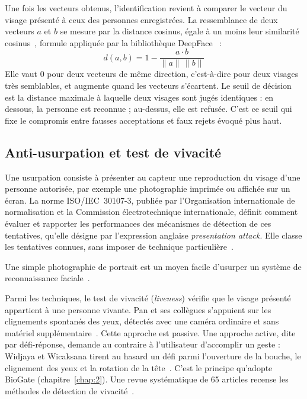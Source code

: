 \begin{maj}
Une fois les vecteurs obtenus, l'identification revient à comparer le vecteur du visage présenté à ceux des personnes enregistrées. La ressemblance de deux vecteurs $a$ et $b$ se mesure par la distance cosinus, égale à un moins leur similarité cosinus~\cite{manning2008ir}, formule appliquée par la bibliothèque DeepFace~\cite{serengil_deepface} :
\[ d(a,b) = 1 - \frac{a \cdot b}{\lVert a \rVert \, \lVert b \rVert} \]
Elle vaut 0 pour deux vecteurs de même direction, c'est-à-dire pour deux visages très semblables, et augmente quand les vecteurs s'écartent. Le seuil de décision est la distance maximale à laquelle deux visages sont jugés identiques : en dessous, la personne est reconnue ; au-dessus, elle est refusée. C'est ce seuil qui fixe le compromis entre fausses acceptations et faux rejets évoqué plus haut.
\end{maj}

\subsection{Anti-usurpation et test de vivacité}

\begin{maj}
Une usurpation consiste à présenter au capteur une reproduction du visage d'une personne autorisée, par exemple une photographie imprimée ou affichée sur un écran. La norme ISO/IEC~30107-3, publiée par l'Organisation internationale de normalisation et la Commission électrotechnique internationale, définit comment évaluer et rapporter les performances des mécanismes de détection de ces tentatives, qu'elle désigne par l'expression anglaise \emph{presentation attack}. Elle classe les tentatives connues, sans imposer de technique particulière~\cite{iso30107}.
\end{maj} Une simple photographie de portrait est un moyen facile d'usurper un système de reconnaissance faciale~\cite{chakraborty2014overview}.

Parmi les techniques, le test de vivacité (\emph{liveness}) vérifie que le visage présenté appartient à une personne vivante. Pan et ses collègues s'appuient sur les clignements spontanés des yeux, détectés avec une caméra ordinaire et sans matériel supplémentaire~\cite{pan2007eyeblink}. Cette approche est passive. Une approche active, dite par défi-réponse, demande au contraire à l'utilisateur d'accomplir un geste : Widjaya et Wicaksana tirent au hasard un défi parmi l'ouverture de la bouche, le clignement des yeux et la rotation de la tête~\cite{widjaya2023challenge}. C'est le principe qu'adopte BioGate (chapitre~\ref{chap:2}). Une revue systématique de 65 articles recense les méthodes de détection de vivacité~\cite{raheem2019insight}.

